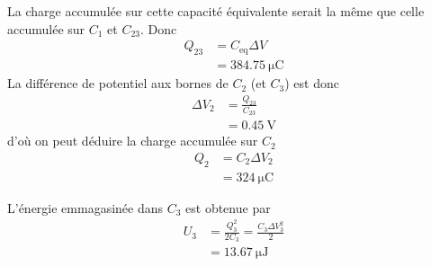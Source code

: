 La charge accumulée sur cette capacité équivalente serait la même que celle
accumulée sur $C_1$ et $C_{23}$. Donc
\begin{align*}
  Q_{23} &= C_\text{eq} \Delta V \\
         &= \SI{384.75}{\micro\coulomb}
\end{align*}
La différence de potentiel aux bornes de $C_2$ (et $C_3$) est donc
\begin{align*}
  \Delta V_{2} &= \frac{Q_{23}}{C_{23}} \\
               &= \SI{0.45}{\volt}
\end{align*}
d'où on peut déduire la charge accumulée sur $C_2$
\begin{align*}
  Q_2 &= C_2 \Delta V_2 \\
      &= \SI{324}{\micro\coulomb}
\end{align*}

L'énergie emmagasinée dans $C_3$ est obtenue par
\begin{align*}
  U_3 &= \frac{Q_3^2}{2C_3} = \frac{C_3 \Delta V_3^2}{2}  \\
      &= \SI{13.67}{\micro\joule}
\end{align*}



